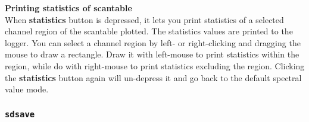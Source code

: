 {\bf Printing statistics of scantable}\\
When {\bf statistics} button is depressed, 
it lets you print statistics of a selected channel region 
of the scantable plotted. 
The statistics values are printed to the logger.
You can select a channel region by left- or right-clicking and 
dragging the mouse to draw a rectangle. 
Draw it with left-mouse to print statistics within the region,
while do with right-mouse to print statistics excluding the region.
Clicking the {\bf statistics} button again will un-depress it and go back 
to the default spectral value mode.




\subsubsection{{\tt sdsave}}
\label{section:sd.sdtasks.tasks.sdsave}


